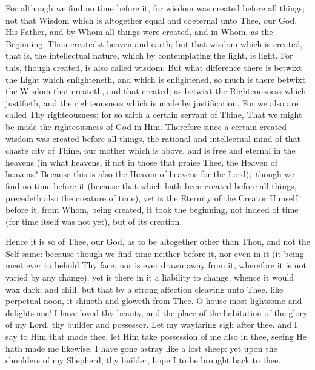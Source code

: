 \documentclass[b5paper,openright,12pt,twoside]{book}
\begin{document}
For although we find no time before it, for wisdom was created before
all things; not that Wisdom which is altogether equal and coeternal unto
Thee, our God, His Father, and by Whom all things were created, and in
Whom, as the Beginning, Thou createdst heaven and earth; but that
wisdom which is created, that is, the intellectual nature, which by
contemplating the light, is light. For this, though created, is also
called wisdom. But what difference there is betwixt the Light which
enlighteneth, and which is enlightened, so much is there betwixt the
Wisdom that createth, and that created; as betwixt the Righteousness
which justifieth, and the righteousness which is made by justification.
For we also are called Thy righteousness; for so saith a certain
servant of Thine, That we might be made the righteousness of God in Him.
Therefore since a certain created wisdom was created before all things,
the rational and intellectual mind of that chaste city of Thine, our
mother which is above, and is free and eternal in the heavens (in
what heavens, if not in those that praise Thee, the Heaven of heavens?
Because this is also the Heaven of heavens for the Lord);--though we
find no time before it (because that which hath been created before all
things, precedeth also the creature of time), yet is the Eternity of
the Creator Himself before it, from Whom, being created, it took the
beginning, not indeed of time (for time itself was not yet), but of its
creation.

Hence it is so of Thee, our God, as to be altogether other than Thou,
and not the Self-same: because though we find time neither before it,
nor even in it (it being meet ever to behold Thy face, nor is ever drawn
away from it, wherefore it is not varied by any change), yet is there in
it a liability to change, whence it would wax dark, and chill, but
that by a strong affection cleaving unto Thee, like perpetual noon, it
shineth and gloweth from Thee. O house most lightsome and delightsome!
I have loved thy beauty, and the place of the habitation of the glory
of my Lord, thy builder and possessor. Let my wayfaring sigh after thee,
and I say to Him that made thee, let Him take possession of me also in
thee, seeing He hath made me likewise. I have gone astray like a lost
sheep: yet upon the shoulders of my Shepherd, thy builder, hope I to be
brought back to thee.
\end{document}
